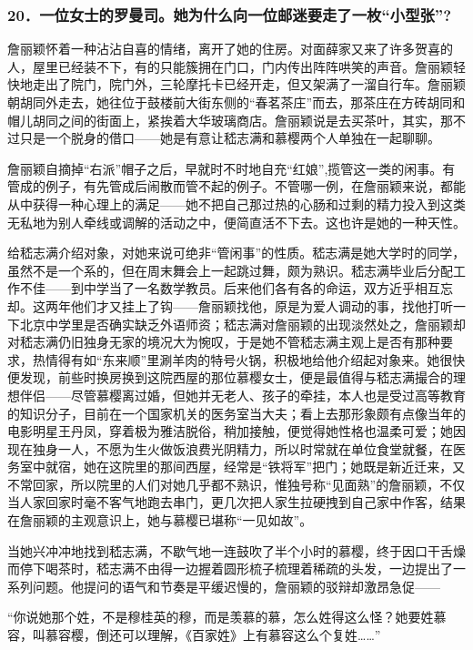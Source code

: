 \subsubsection*{20．一位女士的罗曼司。她为什么向一位邮迷要走了一枚“小型张”?}
\par 詹丽颖怀着一种沾沾自喜的情绪，离开了她的住房。对面薛家又来了许多贺喜的人，屋里已经装不下，有的只能簇拥在门口，门内传出阵阵哄笑的声音。詹丽颖轻快地走出了院门，院门外，三轮摩托卡已经开走，但又架满了一溜自行车。詹丽颖朝胡同外走去，她往位于鼓楼前大街东侧的“春茗茶庄”而去，那茶庄在方砖胡同和帽儿胡同之间的街面上，紧挨着大华玻璃商店。詹丽颖说是去买茶叶，其实，那不过只是一个脱身的借口——她是有意让嵇志满和慕樱两个人单独在一起聊聊。
\par 詹丽颖自摘掉“右派”帽子之后，早就时不时地自充“红娘”,揽管这一类的闲事。有管成的例子，有先管成后闹散而管不起的例子。不管哪一例，在詹丽颖来说，都能从中获得一种心理上的满足——她不把自己那过热的心肠和过剩的精力投入到这类无私地为别人牵线或调解的活动之中，便简直活不下去。这也许是她的一种天性。
\par 给嵇志满介绍对象，对她来说可绝非“管闲事”的性质。嵇志满是她大学时的同学，虽然不是一个系的，但在周末舞会上一起跳过舞，颇为熟识。嵇志满毕业后分配工作不佳——到中学当了一名数学教员。后来他们各有各的命运，双方近乎相互忘却。这两年他们才又挂上了钩——詹丽颖找他，原是为爱人调动的事，找他打听一下北京中学里是否确实缺乏外语师资；嵇志满对詹丽颖的出现淡然处之，詹丽颖却对嵇志满仍旧独身无家的境况大为惋叹，于是她不管嵇志满主观上是否有那种要求，热情得有如“东来顺”里涮羊肉的特号火锅，积极地给他介绍起对象来。她很快便发现，前些时换房换到这院西屋的那位慕樱女士，便是最值得与嵇志满撮合的理想伴侣——尽管慕樱离过婚，但她并无老人、孩子的牵挂，本人也是受过高等教育的知识分子，目前在一个国家机关的医务室当大夫；看上去那形象颇有点像当年的电影明星王丹凤，穿着极为雅洁脱俗，稍加接触，便觉得她性格也温柔可爱；她因现在独身一人，不愿为生火做饭浪费光阴精力，所以时常就在单位食堂就餐，在医务室中就宿，她在这院里的那间西屋，经常是“铁将军”把门；她既是新近迁来，又不常回家，所以院里的人们对她几乎都不熟识，惟独号称“见面熟”的詹丽颖，不仅当人家回家时毫不客气地跑去串门，更几次把人家生拉硬拽到自己家中作客，结果在詹丽颖的主观意识上，她与慕樱已堪称“一见如故”。
\par 当她兴冲冲地找到嵇志满，不歇气地一连鼓吹了半个小时的慕樱，终于因口干舌燥而停下喝茶时，嵇志满不由得一边握着圆形梳子梳理着稀疏的头发，一边提出了一系列问题。他提问的语气和节奏是平缓迟慢的，詹丽颖的驳辩却激昂急促——
\par “你说她那个姓，不是穆桂英的穆，而是羡慕的慕，怎么姓得这么怪？她要姓慕容，叫慕容樱，倒还可以理解，《百家姓》上有慕容这么个复姓……”
